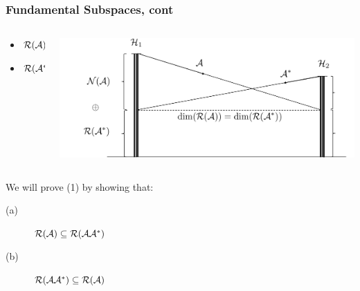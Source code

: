 \documentclass{beamer}
\begin{document}
\begin{frame}\frametitle{Fundamental Subspaces, cont}
	\begin{columns}
		\begin{column}{0.5\textwidth}
				\begin{lemma}
					\begin{itemize}
						\item $\mathcal{R}(\mathcal{A}) = \mathcal{R}(\mathcal{A}\mathcal{A}^\ast)$
						\item $\mathcal{R}(\mathcal{A}^\ast) = \mathcal{R}(\mathcal{A}^\ast\mathcal{A})$
					\end{itemize}
				\end{lemma}
		\end{column}
		\begin{column}{0.5\textwidth}
			\begin{center}
				\includegraphics[width=\textwidth]{figures/chap4_fundamental_subspaces}
			\end{center}	
		\end{column}
	\end{columns}

	\begin{proofstart}
		We will prove (1) by showing that:
		\begin{description}
		\item[(a)] 	$\mathcal{R}(\mathcal{A}) \subseteq \mathcal{R}(\mathcal{A}\mathcal{A}^\ast)$
		\item[(b)]  $\mathcal{R}(\mathcal{A}\mathcal{A}^\ast) \subseteq \mathcal{R}(\mathcal{A})$
		\end{description}
	\end{proofstart}
	
\end{frame}
\end{document}
